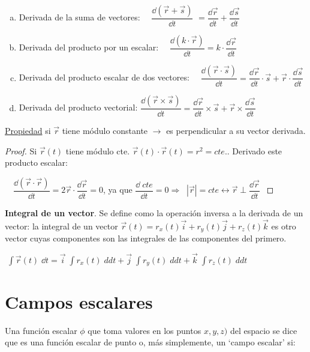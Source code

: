 \begin{enumerate}[a) ]
\item Derivada de la suma de vectores: 
$\quad \dfrac {\dd {(\vec r + \vec s)}}{\dd t }$
$=\dfrac {\dd \vec r}{\dd t }+\dfrac {\dd \vec s}{\dd t }$

\item Derivada del producto por un escalar: $\quad \dfrac {\dd {(k\cdot \vec r)}}{\dd t }= k\cdot \dfrac {\dd \vec r}{\dd t }$
\item Derivada del producto escalar de dos vectores: $\quad \dfrac {\dd (\vec r \cdot \vec s)}{\dd t } = \dfrac {\dd \vec r}{\dd t }\cdot \vec s + \vec r \cdot \dfrac {\dd \vec s}{\dd t }$
\item Derivada del producto vectorial: $\dfrac {\dd (\vec r \times \vec s)}{\dd t }= \dfrac {\dd \vec r}{\dd t }\times \vec s + \vec r \times \dfrac {\dd \vec s}{\dd t }$	
\end{enumerate}

\underline{Propiedad} si $\vec r$ tiene módulo constante $\to$ es perpendicular a su vector derivada.

\begin{proof}\renewcommand{\qedsymbol}{$\diamond$}

Si $\vec r (t)$ tiene módulo cte. $\vec r (t) \cdot \vec r (t)= r^2 =cte.$. Derivado este producto escalar:

$\quad \dfrac {\dd (\vec r \cdot \vec r)}{\dd t }=2\vec r \cdot \dfrac {\dd \vec r}{\dd t}=0$, ya que $\dfrac {\dd \; cte}{\dd t}=0 \Rightarrow \; \boxed{\; |\vec r|=cte \leftrightarrow \displaystyle \vec r \; \bot \;  \dfrac {\dd \vec r}{\dd t }\;} $
\end{proof}

\vspace{4mm} \textbf{Integral de un vector}. Se define como la operación inversa a la derivada de un vector: la integral de un vector $\vec r(t)=r_x(t) \vec i + r_y(t) \vec j + r_z(t) \vec k$ es otro vector cuyas componentes son las integrales de las componentes del primero.

\hspace{20mm} $\boxed{ \; \displaystyle \int \vec r (t)\; \dd t = \vec i \; \int r_x (t)\; dd t + \vec j \; \int r_y (t)\; dd t+ \vec k \; \int r_z (t)\; dd t \; }$

\section{Campos escalares}

Una función escalar $\phi$ que toma valores en los puntos $x,y,z)$ del espacio se dice que es una función escalar de punto o, más simplemente, un `campo escalar' si:

